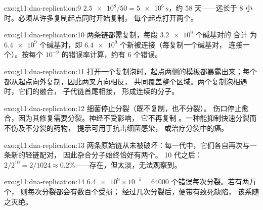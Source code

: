 \begin{solution}{exo:g11:dna-replication:9}
$\num{2.5e8}/50 = \num{5e6}\,\unit{s}$，约 58 天——远长于
8 小时。必须从许多复制起点同时开始复制，
每个起点打开两个。
\end{solution}

\begin{solution}{exo:g11:dna-replication:10}
两条链都需复制，每段 $\num{3.2e9}$ 个碱基对的  合计
为 $\num{6.4e9}$ 个碱基对，即 $\num{6.4e9}$ 个新被连接（每复制一个碱基对，
连接一个）。按每个 $10^{-9}$ 的错误率计算，约有 6 个错误。
\end{solution}

\begin{solution}{exo:g11:dna-replication:11}
打开一个复制泡时，起点两侧的模板都暴露出来；每个
都从起点向外复制，因此两叉方向相反，
共同覆盖整个区域。两个复制泡相遇时，它们的融合，
子代链首尾相接，
形成连续的分子。
\end{solution}

\begin{solution}{exo:g11:dna-replication:12}
细菌停止分裂（既不复制，也不分裂）。
伤口停止愈合，因为其修复需要分裂。神经不受影响，
它不再复制 。一种能抑制快速分裂而不伤及不分裂的药物，
提示可用于抗击细菌感染，
或治疗分裂中的癌。
\end{solution}

\begin{solution}{exo:g11:dna-replication:13}
两条原始链从未被破坏：每一代中，它们各自再次与一条新的轻链配对，
因此杂合分子始终恰好有两个。
10 代之后：$2/2^{10} = 2/1024
\approx 0.2\%$——存在，但太淡，无法观察到。
\end{solution}

\begin{solution}{exo:g11:dna-replication:14}
$\num{6.4e9} \times 10^{-5} = \num{64000}$ 个错误每次分裂。若有两万个，
则每次分裂都会有数百个受损；
经过几次分裂后，便带有致死缺陷，
该系随之灭绝。
\end{solution}

